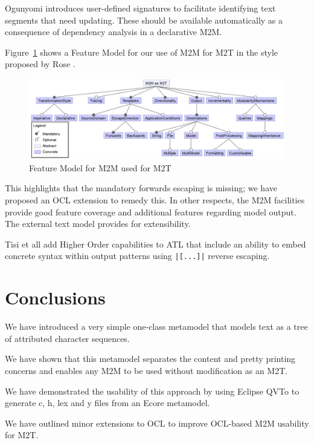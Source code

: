 \documentclass{llncs}
\begin{document}
Ogunyomi \cite{Signatures} introduces user-defined signatures to facilitate identifying text segments that need updating. These should be available automatically as a consequence of dependency analysis in a declarative M2M. 

Figure~\ref{fig:M2MM2TFeatureModel} shows a Feature Model for our use of M2M for M2T in the style proposed by Rose \cite{Feature Model}. 

\begin{figure}
	\begin{center}
		\includegraphics[width=4.9in]{M2MM2TFeatureModel.png}
	\end{center}
	\caption{Feature Model for M2M used for M2T}
	\label{fig:M2MM2TFeatureModel}
\end{figure}

This highlights that the mandatory forwards escaping is missing; we have proposed an OCL extension to remedy this. In other respects, the M2M facilities provide good feature coverage and additional features regarding model output. The external text model provides for extensibility.

Tisi et all \cite{ATLHOT} add Higher Order capabilities to ATL that include an ability to embed concrete syntax within output patterns using \verb$|[...]|$ reverse escaping.

\section{Conclusions}\label{Conclusions}

We have introduced a very simple one-class metamodel that models text as a tree of attributed character sequences.

We have shown that this metamodel separates the content and pretty printing concerns and enables any M2M to be used without modification as an M2T.

We have demonstrated the usability of this approach by using Eclipse QVTo to generate c, h, lex and y files from an Ecore metamodel.

We have outlined minor extensions to OCL to improve OCL-based M2M usability for M2T.
\end{document}
